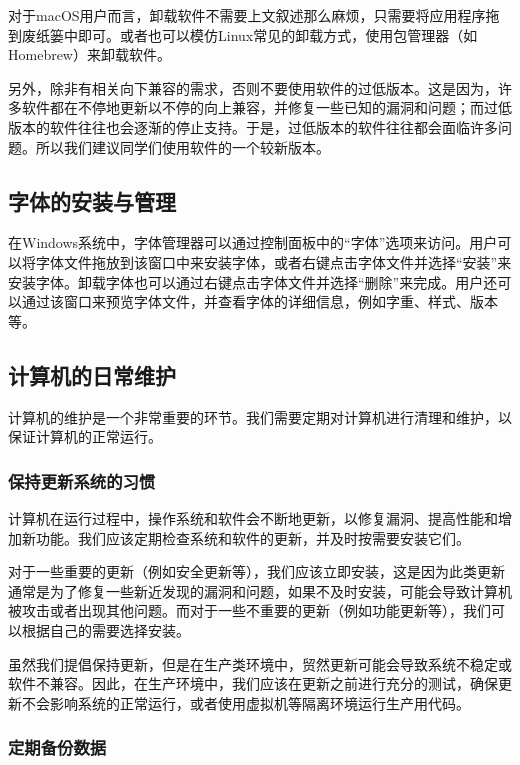 \begin{tip}
对于macOS用户而言，卸载软件不需要上文叙述那么麻烦，只需要将应用程序拖到废纸篓中即可。或者也可以模仿Linux常见的卸载方式，使用包管理器（如Homebrew）来卸载软件。
\end{tip}

另外，除非有相关向下兼容的需求，否则不要使用软件的过低版本。这是因为，许多软件都在不停地更新以不停的向上兼容，并修复一些已知的漏洞和问题；而过低版本的软件往往也会逐渐的停止支持。于是，过低版本的软件往往都会面临许多问题。所以我们建议同学们使用软件的一个较新版本。
\subsection{字体的安装与管理}

在Windows系统中，字体管理器可以通过控制面板中的“字体”选项来访问。用户可以将字体文件拖放到该窗口中来安装字体，或者右键点击字体文件并选择“安装”来安装字体。卸载字体也可以通过右键点击字体文件并选择“删除”来完成。用户还可以通过该窗口来预览字体文件，并查看字体的详细信息，例如字重、样式、版本等。

\subsection{计算机的日常维护}

计算机的维护是一个非常重要的环节。我们需要定期对计算机进行清理和维护，以保证计算机的正常运行。

\subsubsection{保持更新系统的习惯}

计算机在运行过程中，操作系统和软件会不断地更新，以修复漏洞、提高性能和增加新功能。我们应该定期检查系统和软件的更新，并及时按需要安装它们。

对于一些重要的更新（例如安全更新等），我们应该立即安装，这是因为此类更新通常是为了修复一些新近发现的漏洞和问题，如果不及时安装，可能会导致计算机被攻击或者出现其他问题。而对于一些不重要的更新（例如功能更新等），我们可以根据自己的需要选择安装。

\begin{caution}
  虽然我们提倡保持更新，但是在生产类环境中，贸然更新可能会导致系统不稳定或软件不兼容。因此，在生产环境中，我们应该在更新之前进行充分的测试，确保更新不会影响系统的正常运行，或者使用虚拟机等隔离环境运行生产用代码。
\end{caution}

\subsubsection{定期备份数据}

